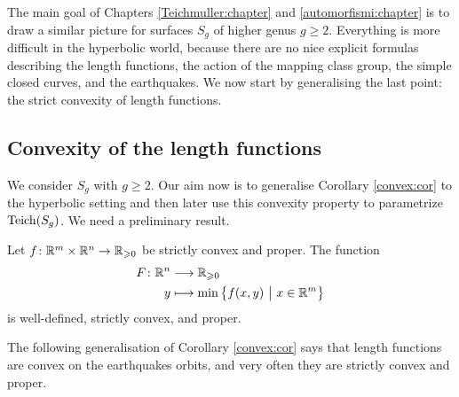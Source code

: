 The main goal of Chapters \ref{Teichmuller:chapter} and \ref{automorfismi:chapter} is to draw a similar picture for surfaces $S_g$ of higher genus $g\geqslant 2$. Everything is more difficult in the hyperbolic world, because there are no nice explicit formulas describing the length functions, the action of the mapping class group, the simple closed curves, and the earthquakes. We now start by generalising the last point: the strict convexity of length functions.

\subsection{Convexity of the length functions} \label{convexity:lengths:subsection}
We consider $S_g$ with $g\geqslant 2$. Our aim now is to generalise Corollary \ref{convex:cor} to the hyperbolic setting and then later use this convexity property to parametrize ${\rm Teich}(S_g)$. We need a preliminary result.

\begin{ex} \label{convessa:ex}
Let $f\colon \mathbb{R}^m \times \mathbb{R}^n \to \mathbb{R}_{\geqslant 0}$ be strictly convex and proper. The function
\begin{align*}
F\colon \mathbb{R}^n & \longrightarrow \mathbb{R}_{\geqslant 0} \\
y & \longmapsto \min \left\{f(x,y)\ \big| \ x \in \mathbb{R}^m \right\}
\end{align*}
is well-defined, strictly convex, and proper. 
\end{ex}

The following generalisation of Corollary \ref{convex:cor} says that length functions are convex on the earthquakes orbits, and very often they are strictly convex and proper.

